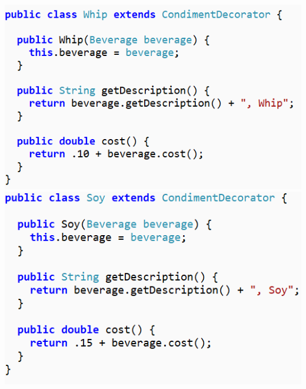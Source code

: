 \begin{multicols}{2}
	\includegraphics[width=0.9\columnwidth]{GALLEYS/images/chapter4/images6}
	\includegraphics[width=0.9\columnwidth]{GALLEYS/images/chapter4/images7}
\end{multicols}

